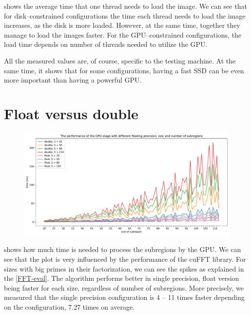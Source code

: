  shows the average time that one thread needs to load the image. We can see that for disk--constrained configurations the time each thread needs to load the image increases, as the disk is more loaded. However, at the same time, together they manage to load the images faster. For the GPU--constrained configurations, the load time depends on number of threads needed to utilize the GPU.

All the measured values are, of course, specific to the testing machine. At the same time, it shows that for some configurations, having a fast SSD can be even more important than having a powerful GPU.

\section{Float versus double}

\begin{figure}
	\centering
	\includegraphics[width=\textwidth]{img/eval/float-double-compare}
	\caption{}
	\label{float-double-compare}
\end{figure}



 shows how much time is needed to process the subregions by the GPU. We can see that the plot is very influenced by the performance of the cuFFT library. For sizes with big primes in their factorization, we can see the spikes as explained in the \cref{FFT-eval}. The algorithm performs better in single precision, float version being faster for each size, regardless of number of subregions. More precisely, we measured that the single precision configuration is 4 -- 11 times faster depending on the configuration, 7.27 times on average.

